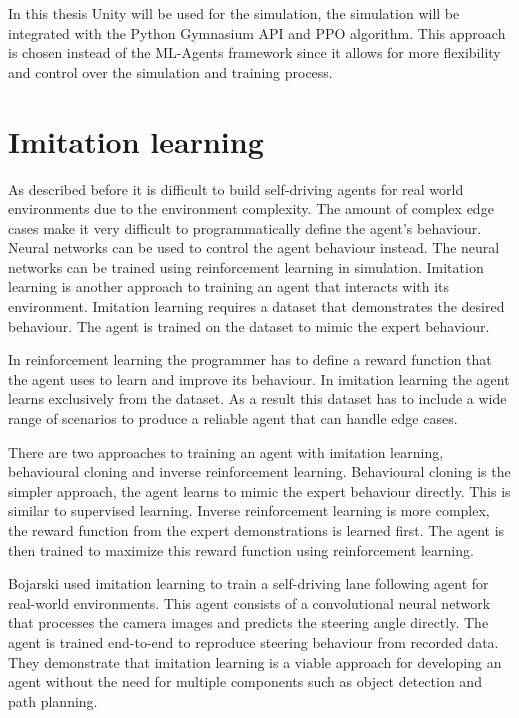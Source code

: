 In this thesis Unity will be used for the simulation, the simulation will be integrated with the Python Gymnasium API and PPO algorithm. This approach is chosen instead of the ML-Agents framework since it allows for more flexibility and control over the simulation and training process.


\section{Imitation learning}
As described before it is difficult to build self-driving agents for real world environments due to the environment complexity. The amount of complex edge cases make it very difficult to programmatically define the agent's behaviour. Neural networks can be used to control the agent behaviour instead. The neural networks can be trained using reinforcement learning in simulation. 
Imitation learning is another approach to training an agent that interacts with its environment. Imitation learning requires a dataset that demonstrates the desired behaviour. The agent is trained on the dataset to mimic the expert behaviour.

In reinforcement learning the programmer has to define a reward function that the agent uses to learn and improve its behaviour. In imitation learning the agent learns exclusively from the dataset. As a result this dataset has to include a wide range of scenarios to produce a reliable agent that can handle edge cases.

There are two approaches to training an agent with imitation learning, behavioural cloning and inverse reinforcement learning. Behavioural cloning is the simpler approach, the agent learns to mimic the expert behaviour directly. This is similar to supervised learning. Inverse reinforcement learning is more complex, the reward function from the expert demonstrations is learned first. The agent is then trained to maximize this reward function using reinforcement learning. 

Bojarski \textcite{bojarski2016endToEnd} used imitation learning to train a self-driving lane following agent for real-world environments. This agent consists of a convolutional neural network that processes the camera images and predicts the steering angle directly. The agent is trained end-to-end to reproduce steering behaviour from recorded data. They demonstrate that imitation learning is a viable approach for developing an agent without the need for multiple components such as object detection and path planning.

